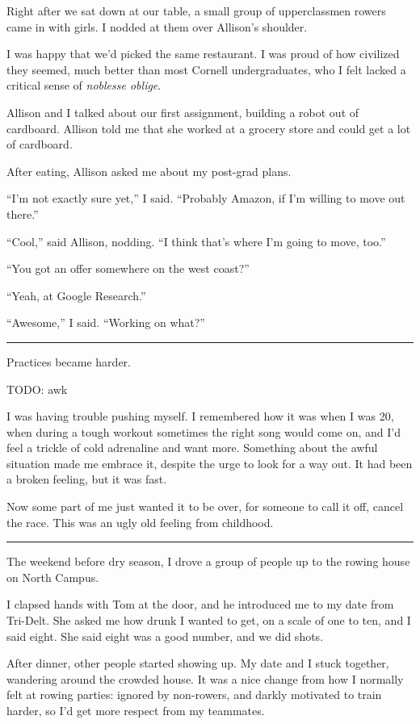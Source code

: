 Right after we sat down at our table, a small group of upperclassmen
rowers came in with girls.  I nodded at them over Allison's shoulder.  

I was happy that we'd picked the same restaurant.  I was proud of how civilized
they seemed, much better than most Cornell undergraduates, who I felt
lacked a critical sense of \textit{noblesse oblige}.

Allison and I talked about our first assignment, building a robot out of
cardboard.  Allison told me that she worked at a grocery store and could get a
lot of cardboard.  

After eating, Allison asked me about my post-grad plans.  

``I'm not exactly sure yet,'' I said.  ``Probably Amazon, if I'm willing to move
out there.''

``Cool,'' said Allison, nodding.  ``I think that's where I'm going to move,
too.''

``You got an offer somewhere on the west coast?''

``Yeah, at Google Research.''

``Awesome,'' I said.  ``Working on what?''

\plainfancybreak{12pt}{2}{* * *}


Practices became harder.

TODO: awk

I was having trouble pushing myself.  I remembered how it was when I was 20,
when during a tough workout sometimes the right song would come on, and I'd feel
a trickle of cold adrenaline and want more.  Something about the awful situation
made me embrace it, despite the urge to look for a way out.  It had been a
broken feeling, but it was fast.

Now some part of me just wanted it to be over, for someone to call it off,
cancel the race.  This was an ugly old feeling from childhood.

\plainfancybreak{12pt}{2}{}

The weekend before dry season, I drove a group of people up to the rowing house
on North Campus.

I clapsed hands with Tom at the door, and he introduced me to my date from
Tri-Delt.  She asked me how drunk I wanted to get, on a scale of one to ten, and
I said eight.  She said eight was a good number, and we did shots.  

After dinner, other people started showing up.  My date and I stuck together,
wandering around the crowded house.  It was a nice change from how I normally
felt at rowing parties: ignored by non-rowers, and darkly motivated to train
harder, so I'd get more respect from my teammates.

